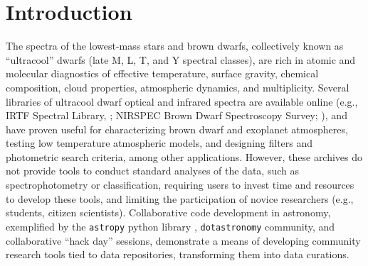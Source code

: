 \documentclass[usenatbib]{basi}
\begin{document}





\section{Introduction}\label{s:intro}

The spectra of the lowest-mass stars and brown dwarfs, collectively {known as}  ``ultracool'' dwarfs (late M, L, T, and Y spectral classes),
are rich in atomic and molecular diagnostics of effective temperature, surface gravity, {chemical} composition, cloud properties, atmospheric dynamics, and multiplicity. Several libraries of ultracool
dwarf optical and infrared spectra are available online (e.g., IRTF Spectral Library, \citealt{2009ApJS..185..289R}; NIRSPEC Brown Dwarf Spectroscopy Survey; \citealt{2003ApJ...596..561M}), and have proven useful
for characterizing brown dwarf and exoplanet atmospheres, testing low temperature
atmospheric models, and designing filters and photometric search criteria, among other applications.
However, these archives do not provide tools to conduct 
standard analyses of the data, such as spectrophotometry or classification, requiring users to invest time and resources to develop these tools, and limiting the participation of novice researchers (e.g., students, citizen scientists).  Collaborative code development in astronomy, exemplified by the \texttt{astropy} python library \citep{2013A&A...558A..33A}, \texttt{dotastronomy} community,
and collaborative ``hack day'' sessions, demonstrate a means of developing community research
tools tied to data repositories, transforming them into data curations.
\end{document}
